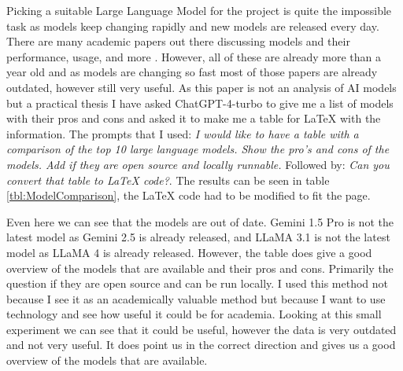 Picking a suitable Large Language Model for the project is quite the impossible task as models keep changing rapidly and new models are released every day. There are many academic papers out there discussing models and their performance, usage, and more \cite{2024arXiv240201687A,chang2024survey,hadi2023survey,zhao2023survey}. However, all of these are already more than a year old and as models are changing so fast most of those papers are already outdated, however still very useful. As this paper is not an analysis of AI models but a practical thesis I have asked ChatGPT-4-turbo to give me a list of models with their pros and cons and asked it to make me a table for LaTeX with the information. The prompts that I used: \textit{I would like to have a table with a comparison of the top 10 large language models. Show the pro's and cons of the models. Add if they are open source and locally runnable.} Followed by: \textit{Can you convert that table to LaTeX code?}. The results can be seen in table \ref{tbl:ModelComparison}, the LaTeX code had to be modified to fit the page.

Even here we can see that the models are out of date. Gemini 1.5 Pro is not the latest model as Gemini 2.5 is already released, and LLaMA 3.1 is not the latest model as LLaMA 4 is already released. However, the table does give a good overview of the models that are available and their pros and cons. Primarily the question if they are open source and can be run locally. I used this method not because I see it as an academically valuable method but because I want to use technology and see how useful it could be for academia. Looking at this small experiment we can see that it could be useful, however the data is very outdated and not very useful. It does point us in the correct direction and gives us a good overview of the models that are available.

